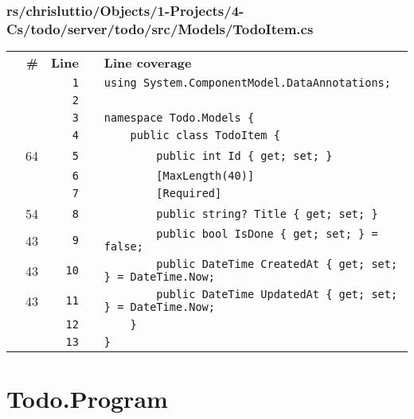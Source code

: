 \documentclass[a4paper,landscape,10pt]{article}
\begin{document}
\subsubsection{rs/chrisluttio/Objects/1-Projects/4-Cs/todo/server/todo/src/Models/TodoItem.cs}
\begin{longtable}[l]{lrrll}
\textbf{} & \textbf{\#} & \textbf{Line} & \textbf{} & \textbf{Line coverage}\\
\cellcolor{gray} &  & \verb~1~ & & \verb~using System.ComponentModel.DataAnnotations;~\\
\cellcolor{gray} &  & \verb~2~ & & \verb~~\\
\cellcolor{gray} &  & \verb~3~ & & \verb~namespace Todo.Models {~\\
\cellcolor{gray} &  & \verb~4~ & & \verb~    public class TodoItem {~\\
\cellcolor{green} & 64 & \verb~5~ & & \verb~        public int Id { get; set; }~\\
\cellcolor{gray} &  & \verb~6~ & & \verb~        [MaxLength(40)]~\\
\cellcolor{gray} &  & \verb~7~ & & \verb~        [Required]~\\
\cellcolor{green} & 54 & \verb~8~ & & \verb~        public string? Title { get; set; }~\\
\cellcolor{green} & 43 & \verb~9~ & & \verb~        public bool IsDone { get; set; } = false;~\\
\cellcolor{green} & 43 & \verb~10~ & & \verb~        public DateTime CreatedAt { get; set; } = DateTime.Now;~\\
\cellcolor{green} & 43 & \verb~11~ & & \verb~        public DateTime UpdatedAt { get; set; } = DateTime.Now;~\\
\cellcolor{gray} &  & \verb~12~ & & \verb~    }~\\
\cellcolor{gray} &  & \verb~13~ & & \verb~}~\\
\end{longtable}
\newpage
\section{Todo.Program}
\end{document}
